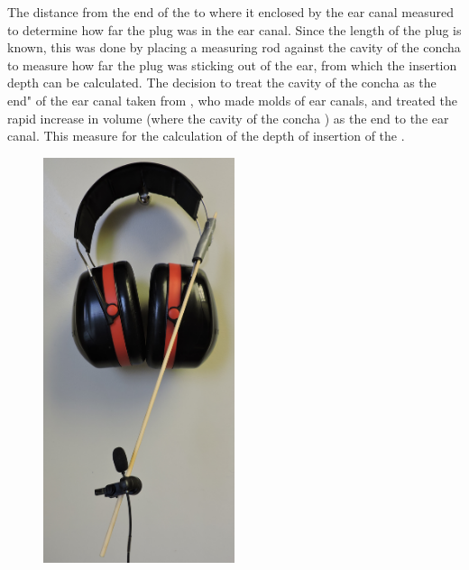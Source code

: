The distance from the end of the \DIFdelbegin {}\DIFdelend \DIFaddbegin {}\DIFaddend to where it \DIFdelbegin {}\DIFdelend \DIFaddbegin {}\DIFaddend enclosed by the ear canal \DIFdelbegin {}\DIFdelend \DIFaddbegin {}\DIFaddend measured to determine how far the plug was \DIFdelbegin {}\DIFdelend \DIFaddbegin {}\DIFaddend in the ear canal.
Since the length of the plug is known, this was done by placing a measuring rod against the cavity of the concha to measure how far the plug was sticking out of the ear, from which the insertion depth can be calculated. The decision to treat the cavity of the concha as the \DIFdelbegin {}\DIFdelend \DIFaddbegin {}\DIFaddend end" of the ear canal \DIFdelbegin {}\DIFdelend \DIFaddbegin {}\DIFaddend taken from \cite{stenfelt:07}, who made molds of ear canals, and treated the rapid increase in volume (where the cavity of the concha \DIFdelbegin {}\DIFdelend \DIFaddbegin {}\DIFaddend ) as the end to the ear canal.  This measure \DIFdelbegin {}\DIFdelend \DIFaddbegin {}\DIFaddend for the calculation of the depth of insertion of the \DIFdelbegin {}\DIFdelend \DIFaddbegin {}\DIFaddend .

\DIFaddbegin \begin{figure}
\includegraphics[width=0.5\textwidth]{figure/earmuffSetup.JPG}
\caption{}
\label{fig:micInsertPlug}
\end{figure}

